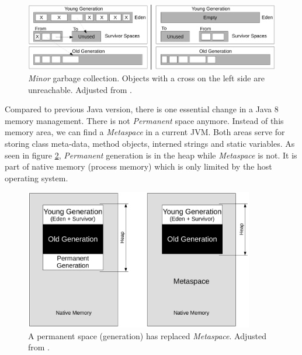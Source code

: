 \documentclass[
  digital, %
  oneside,
  notable, %
  nolof,     %
  nolot     %
]{fithesis3}
\begin{document}
\begin{figure}[h]
	\centering
	\includegraphics[width=13cm]{fig/minor.pdf}
	\caption{\textit{Minor} garbage collection. Objects with a cross on the left side are unreachable. Adjusted from \cite{hunt}.}
	\label{minor}
\end{figure}

Compared to previous Java version, there is one essential change in a Java 8 memory management. There is not \textit{Permanent} space anymore. Instead of this memory area, we can find a \textit{Metaspace} in a current JVM. Both areas serve for storing class meta-data, method objects, interned strings and static variables. As seen in figure \ref{metaspace}, \textit{Permanent} generation is in the heap while \textit{Metaspace} is not. It is part of native memory (process memory) which is only limited by the host operating system. \cite{metaspace}

\begin{figure}[h]
	\centering
	\includegraphics[width=10cm]{fig/metaspace.pdf}
	\caption{A permanent space (generation) has replaced \textit{Metaspace}. Adjusted from \cite{metaspace}.}
	\label{metaspace}
\end{figure}
\end{document}
